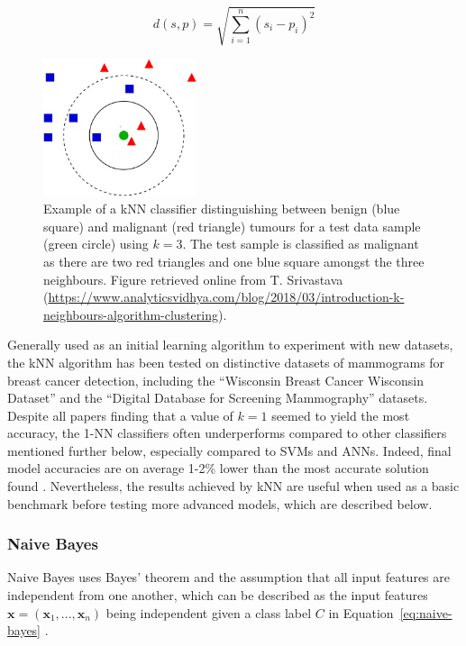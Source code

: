 \begin{equation}
\label{eq:euclidian-distance}
    d(s,p)=\sqrt{\sum_{i=1}^{n}(s_i-p_i)^2}
\end{equation}

\begin{figure}[h]
\centerline{\includegraphics[width=0.4\textwidth]{Dissertation/figures/litsurvey/knn.png}}
\caption{\label{fig:litsurvey-knn-example}Example of a kNN classifier distinguishing between benign (blue square) and malignant (red triangle) tumours for a test data sample (green circle) using $k=3$. The test sample is classified as malignant as there are two red triangles and one blue square amongst the three neighbours. Figure retrieved online from T. Srivastava (\url{https://www.analyticsvidhya.com/blog/2018/03/introduction-k-neighbours-algorithm-clustering}).}
\end{figure}

Generally used as an initial learning algorithm to experiment with new datasets, the kNN algorithm has been tested on distinctive datasets of mammograms for breast cancer detection, including the ``Wisconsin Breast Cancer Wisconsin Dataset'' \citep{Wolberg1995} and the ``Digital Database for Screening Mammography'' \citep{DDSMdataset2001} datasets. Despite all papers finding that a value of $k=1$ seemed to yield the most accuracy, the 1-NN classifiers often underperforms compared to other classifiers mentioned further below, especially compared to SVMs and ANNs. Indeed, final model accuracies are on average 1-2\% lower than the most accurate solution found \citep{Yue2018, Asri2016, Montazeri2016}. Nevertheless, the results achieved by kNN are useful when used as a basic benchmark before testing more advanced models, which are described below.

\subsubsection{Naive Bayes}

Naive Bayes uses Bayes' theorem and the assumption that all input features are independent from one another, which can be described as the input features $\textbf{x}=(\textbf{x}_1, ..., \textbf{x}_n)$ being independent given a class label $C$ in Equation~\ref{eq:naive-bayes} \citep{rish2001empirical}.


